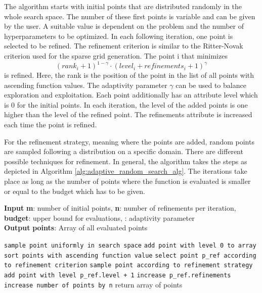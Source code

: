 The algorithm starts with initial points that are distributed randomly in the whole search space. The number of these first points is variable and can be given by the user. A suitable value is dependent on the problem and the number of hyperparameters to be optimized. In each following iteration, one point is selected to be refined. The refinement criterion is similar to the Ritter-Novak criterion used for the sparse grid generation. The point i that minimizes 
\begin{equation}
\label{eq:refinement_criterion}
	(rank_i + 1)^{1-\gamma} \cdot (level_i + refinements_i + 1)^\gamma
\end{equation} 
is refined. Here, the rank is the position of the point in the list of all points with ascending function values. The adaptivity parameter $ \gamma $ can be used to balance exploration and exploitation. Each point additionally has an attribute level which is 0 for the initial points. In each iteration, the level of the added points is one higher than the level of the refined point. The refinements attribute is increased each time the point is refined. \newline

For the refinement strategy, meaning where the points are added, random points are sampled following a distribution on a specific domain. There are different possible techniques for refinement. In general, the algorithm takes the steps as depicted in Algorithm \ref{alg:adaptive_random_search_alg}. The iterations take place as long as the number of points where the function is evaluated is smaller or equal to the budget which has to be given.

\begin{algorithm}[H]
	\caption{  }
	\label{alg:adaptive_random_search_alg}
	\textbf{Input} \textbf{m}: number of initial points, \textbf{n}: number of refinements per iteration, \textbf{budget}: upper bound for evaluations, \boldmath{ $ \gamma $}: adaptivity parameter\\
	\textbf{Output} \textbf{points}: Array of all evaluated points
	\begin{algorithmic}
			\State \texttt{sample point uniformly in search space}
			\State \texttt{add point with level 0 to array}
		\EndFor
			\State \texttt{sort points with ascending function value}
			\State \texttt{select point p\_ref according to refinement criterion}
				\State \texttt{sample point according to refinement strategy}
				\State \texttt{add point with level p\_ref.level + 1}
				\State \texttt{increase p\_ref.refinements}
			\EndFor
			\State \texttt{increase number of points by n}
		\EndWhile
		\State return array of points
	\end{algorithmic}
\end{algorithm}


